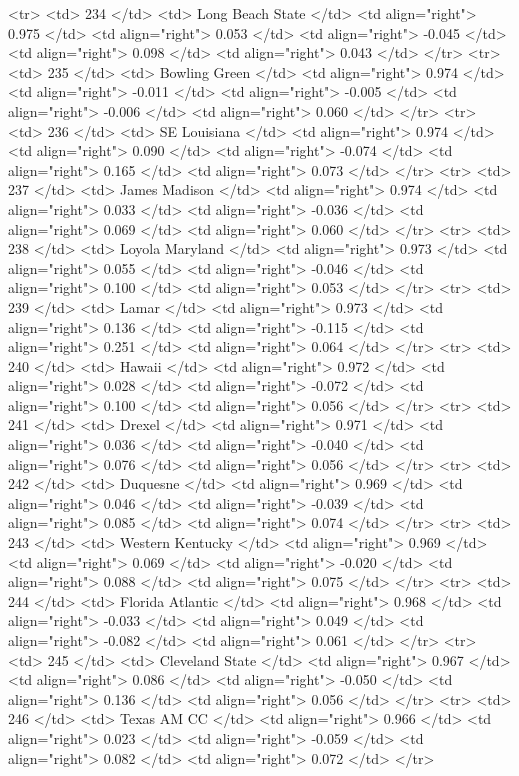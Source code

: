   <tr> <td> 234 </td> <td> Long Beach State </td> <td align="right"> 0.975 </td> <td align="right"> 0.053 </td> <td align="right"> -0.045 </td> <td align="right"> 0.098 </td> <td align="right"> 0.043 </td> </tr>
  <tr> <td> 235 </td> <td> Bowling Green </td> <td align="right"> 0.974 </td> <td align="right"> -0.011 </td> <td align="right"> -0.005 </td> <td align="right"> -0.006 </td> <td align="right"> 0.060 </td> </tr>
  <tr> <td> 236 </td> <td> SE Louisiana </td> <td align="right"> 0.974 </td> <td align="right"> 0.090 </td> <td align="right"> -0.074 </td> <td align="right"> 0.165 </td> <td align="right"> 0.073 </td> </tr>
  <tr> <td> 237 </td> <td> James Madison </td> <td align="right"> 0.974 </td> <td align="right"> 0.033 </td> <td align="right"> -0.036 </td> <td align="right"> 0.069 </td> <td align="right"> 0.060 </td> </tr>
  <tr> <td> 238 </td> <td> Loyola Maryland </td> <td align="right"> 0.973 </td> <td align="right"> 0.055 </td> <td align="right"> -0.046 </td> <td align="right"> 0.100 </td> <td align="right"> 0.053 </td> </tr>
  <tr> <td> 239 </td> <td> Lamar </td> <td align="right"> 0.973 </td> <td align="right"> 0.136 </td> <td align="right"> -0.115 </td> <td align="right"> 0.251 </td> <td align="right"> 0.064 </td> </tr>
  <tr> <td> 240 </td> <td> Hawaii </td> <td align="right"> 0.972 </td> <td align="right"> 0.028 </td> <td align="right"> -0.072 </td> <td align="right"> 0.100 </td> <td align="right"> 0.056 </td> </tr>
  <tr> <td> 241 </td> <td> Drexel </td> <td align="right"> 0.971 </td> <td align="right"> 0.036 </td> <td align="right"> -0.040 </td> <td align="right"> 0.076 </td> <td align="right"> 0.056 </td> </tr>
  <tr> <td> 242 </td> <td> Duquesne </td> <td align="right"> 0.969 </td> <td align="right"> 0.046 </td> <td align="right"> -0.039 </td> <td align="right"> 0.085 </td> <td align="right"> 0.074 </td> </tr>
  <tr> <td> 243 </td> <td> Western Kentucky </td> <td align="right"> 0.969 </td> <td align="right"> 0.069 </td> <td align="right"> -0.020 </td> <td align="right"> 0.088 </td> <td align="right"> 0.075 </td> </tr>
  <tr> <td> 244 </td> <td> Florida Atlantic </td> <td align="right"> 0.968 </td> <td align="right"> -0.033 </td> <td align="right"> 0.049 </td> <td align="right"> -0.082 </td> <td align="right"> 0.061 </td> </tr>
  <tr> <td> 245 </td> <td> Cleveland State </td> <td align="right"> 0.967 </td> <td align="right"> 0.086 </td> <td align="right"> -0.050 </td> <td align="right"> 0.136 </td> <td align="right"> 0.056 </td> </tr>
  <tr> <td> 246 </td> <td> Texas AM CC </td> <td align="right"> 0.966 </td> <td align="right"> 0.023 </td> <td align="right"> -0.059 </td> <td align="right"> 0.082 </td> <td align="right"> 0.072 </td> </tr>
